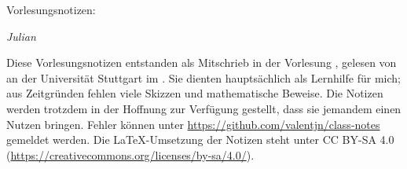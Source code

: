 

\ihead{\vorlesung{}}
\ifoot{\vspace{-1.5mm}\headmark}

\thispagestyle{empty}
\vspace*{1em}

{%
  \huge%
  Vorlesungsnotizen: \vorlesung{}\par%
}
\vspace*{1em}

\emph{Julian }

\vspace*{1em}

Diese Vorlesungsnotizen entstanden als Mitschrieb in der Vorlesung \vorlesung{},
gelesen von \dozent{} an der Universität Stuttgart im \semester{}.
Sie dienten hauptsächlich als Lernhilfe für mich;
aus Zeitgründen fehlen viele Skizzen und mathematische Beweise.
Die Notizen werden trotzdem in der Hoffnung zur Verfügung gestellt,
dass sie jemandem einen Nutzen bringen.
Fehler können unter \url{https://github.com/valentjn/class-notes} gemeldet werden.
Die \LaTeX{}-Umsetzung der Notizen steht unter CC BY-SA 4.0
(\url{https://creativecommons.org/licenses/by-sa/4.0/}).

{%
  \renewcommand*{\chaptermarkformat}{}

  \tableofcontents%
}

\pagebreak


